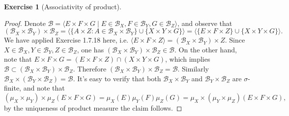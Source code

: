 \documentclass[a4paper]{article}
\newtheorem{ex}{Exercise}[subsection]
\begin{document}
\begin{ex}[Associativity of product]\end{ex}\begin{proof}
Denote $\mathcal{B} = \langle E \times F \times G \mid E \in \mathcal{B}_X, F \in \mathcal{B}_Y, G \in \mathcal{B}_Z\rangle$,
and observe that $$
(\mathcal{B}_X \times \mathcal{B}_Y) \times \mathcal{B}_Z = \langle \{A \times Z : A \in \mathcal{B}_X \times \mathcal{B}_Y\} \cup 
\{X \times Y \times G \}\rangle = \langle \{E \times F \times Z\} \cup \{X \times Y \times G\}\rangle.
$$We have applied Exercise 1.7.18 here, i.e. $\langle E \times F \times Z\rangle = (\mathcal{B}_X \times \mathcal{B}_Y) \times Z$.
Since $X \in \mathcal{B}_X, Y \in \mathcal{B}_Y, Z \in \mathcal{B}_Z$, one has $(\mathcal{B}_X \times \mathcal{B}_Y) \times \mathcal{B}_Z \in \mathcal{B}$.
On the other hand, note that $E \times F \times G = (E \times F \times Z) \cap (X \times Y \times G)$, which implies 
$\mathcal{B} \subset (\mathcal{B}_X \times \mathcal{B}_Y) \times \mathcal{B}_Z$. Therefore 
$(\mathcal{B}_X \times \mathcal{B}_Y) \times \mathcal{B}_Z = \mathcal{B}$. Similarly 
$\mathcal{B}_X \times (\mathcal{B}_Y \times \mathcal{B}_Z) = \mathcal{B}$. It's easy to verify that both
$\mathcal{B}_X \times \mathcal{B}_Y$ and $\mathcal{B}_Y \times \mathcal{B}_Z$ are $\sigma$-finite, and note that$$
(\mu_X \times \mu_Y) \times \mu_Z(E \times F \times G) = \mu_X(E)\mu_Y(F)\mu_Z(G) = 
\mu_X \times (\mu_Y \times \mu_Z)(E \times F \times G),
$$by the uniqueness of product measure the claim follows.
\end{proof}
\end{document}
